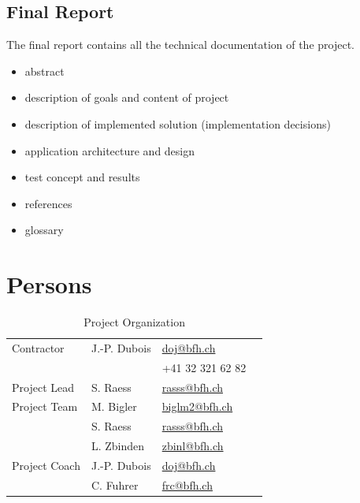 \documentclass[11pt,a4paper]{article}
\begin{document}
\subsection{Final Report}
The final report contains all the technical documentation of the project.
\begin{itemize}
 \item abstract
 \item description of goals and content of project
 \item description of implemented solution (implementation decisions)
 \item application architecture and design
 \item test concept and results
 \item references
 \item glossary
\end{itemize}


\section{Persons}

\begin{table}[H]
 \begin{center}
 \begin{tabular}{|l|l|l|l|}
 \hline
 Contractor             &  J.-P. Dubois     & \href{mailto:doj@bfh.ch}{doj@bfh.ch} \\
                        &                   &  +41 32 321 62 82 \\
 \hline
 Project Lead           &  S. Raess         & \href{mailto:rasss@bfh.ch}{rasss@bfh.ch} \\
 \hline
 Project Team           &  M. Bigler        & \href{mailto:biglm2@bfh.ch}{biglm2@bfh.ch} \\ 
                        &  S. Raess         & \href{mailto:rasss@bfh.ch}{rasss@bfh.ch} \\
                        &  L. Zbinden       & \href{mailto:zbinl@bfh.ch}{zbinl@bfh.ch} \\
 \hline
 Project Coach          &  J.-P. Dubois     & \href{mailto:doj@bfh.ch}{doj@bfh.ch} \\
                        &  C. Fuhrer        & \href{frc@bfh.ch}{frc@bfh.ch} \\
 \hline
 \end{tabular}
 \end{center}
 \caption{Project Organization}
 \label{table: Project Organization}
\end{table}
\end{document}

